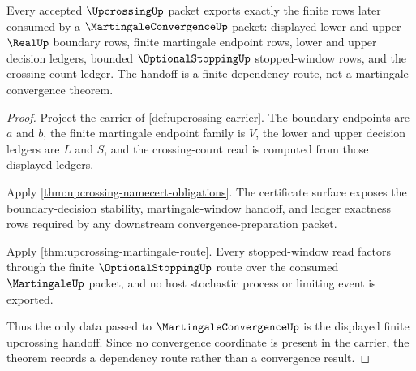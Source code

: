 \begin{theorem}
\label{thm:upcrossing-inequality-martingale-convergence-handoff}
Every accepted $\UpcrossingUp$ packet exports exactly the finite rows later consumed by a $\MartingaleConvergenceUp$ packet: displayed lower and upper $\RealUp$ boundary rows, finite martingale endpoint rows, lower and upper decision ledgers, bounded $\OptionalStoppingUp$ stopped-window rows, and the crossing-count ledger. The handoff is a finite dependency route, not a martingale convergence theorem.
\end{theorem}
\begin{proof}
Project the carrier of \autoref{def:upcrossing-carrier}. The boundary endpoints are $a$ and $b$, the finite martingale endpoint family is $V$, the lower and upper decision ledgers are $L$ and $S$, and the crossing-count read is computed from those displayed ledgers.

Apply \autoref{thm:upcrossing-namecert-obligations}. The certificate surface exposes the boundary-decision stability, martingale-window handoff, and ledger exactness rows required by any downstream convergence-preparation packet.

Apply \autoref{thm:upcrossing-martingale-route}. Every stopped-window read factors through the finite $\OptionalStoppingUp$ route over the consumed $\MartingaleUp$ packet, and no host stochastic process or limiting event is exported.

Thus the only data passed to $\MartingaleConvergenceUp$ is the displayed finite upcrossing handoff. Since no convergence coordinate is present in the carrier, the theorem records a dependency route rather than a convergence result.
\end{proof}

